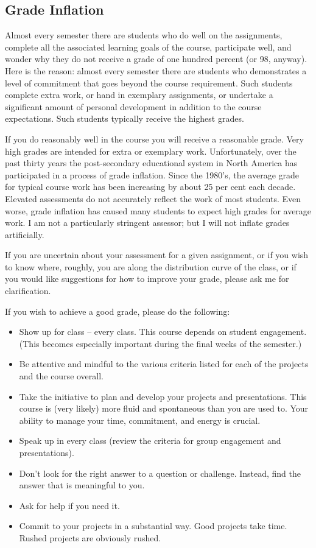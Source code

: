 \documentclass[letterpaper,10pt,headsepline]{scrreprt}
\begin{document}
\subsection{Grade Inflation}
Almost every semester there are students who do well on the assignments, complete all the associated learning goals of the course, participate well, and wonder why they do not receive a grade of one hundred percent (or 98, anyway). Here is the reason: almost every semester there are students who demonstrates a level of commitment that goes beyond the course requirement. Such students complete extra work, or hand in exemplary assignments, or undertake a significant amount of personal development in addition to the course expectations. Such students typically receive the highest grades.

If you do reasonably well in the course you will receive a reasonable grade. Very high grades are intended for extra or exemplary work. Unfortunately, over the past thirty years the post-secondary educational system in North America has participated in a process of grade inflation. Since the 1980's, the average grade for typical course work has been increasing by about 25 per cent each decade. Elevated assessments do not accurately reflect the work of most students. Even worse, grade inflation has caused many students to expect high grades for average work. I am not a particularly stringent assessor; but I will not inflate grades artificially.

If you are uncertain about your assessment for a given assignment, or if you wish to know where, roughly, you are along the distribution curve of the class, or if you would like suggestions for how to improve your grade, please ask me for clarification.

If you wish to achieve a good grade, please do the following:

\begin{itemize}
\item Show up for class -- every class. This course depends on student engagement. (This becomes especially important during the final weeks of the semester.)
\item Be attentive and mindful to the various criteria listed for each of the projects and the course overall.
\item Take the initiative to plan and develop your projects and presentations. This course is (very likely) more fluid and spontaneous than you are used to. Your ability to manage your time, commitment, and energy is crucial.
\item Speak up in every class (review the criteria for group engagement and presentations).
\item Don't look for the right answer to a question or challenge. Instead, find the answer that is meaningful to you.
\item Ask for help if you need it.
\item Commit to your projects in a substantial way. Good projects take time. Rushed projects are obviously rushed.
\end{itemize}
\end{document}
